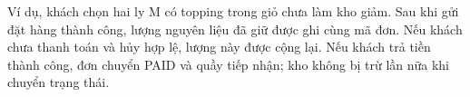 Ví dụ, khách chọn hai ly M có topping trong giỏ chưa làm kho giảm. Sau khi gửi đặt hàng thành công, lượng nguyên liệu đã giữ được ghi cùng mã đơn. Nếu khách chưa thanh toán và hủy hợp lệ, lượng này được cộng lại. Nếu khách trả tiền thành công, đơn chuyển PAID và quầy tiếp nhận; kho không bị trừ lần nữa khi chuyển trạng thái.
